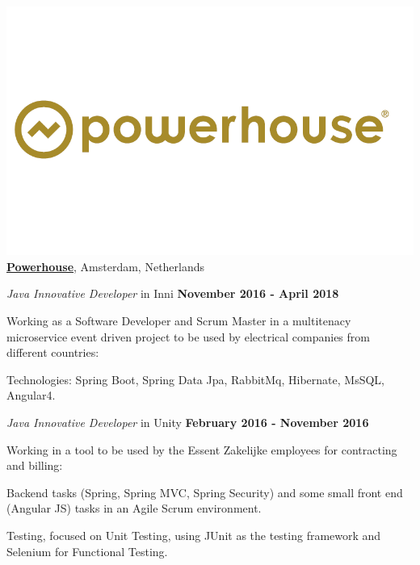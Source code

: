 \includegraphics[scale=0.1]{companies/powerhouse} \href{https://www.powerhouse.nl/}{\textbf{Powerhouse}},
Amsterdam, Netherlands
\begin{outerlist}
\item[] \textit{Java Innovative Developer} in Inni%
        \hfill \textbf{November 2016 - April 2018}

Working as a Software Developer and Scrum Master in a multitenacy microservice event driven project to be used by electrical companies from different countries:
\begin{innerlist}
\item Technologies: Spring Boot, Spring Data Jpa, RabbitMq, Hibernate, MsSQL, Angular4.
\end{innerlist}
\item[] \textit{Java Innovative Developer} in Unity%
        \hfill \textbf{February 2016 - November 2016}

Working in a tool to be used by the Essent Zakelijke employees for contracting and billing:
\begin{innerlist}
\item Backend tasks (Spring, Spring MVC, Spring Security) and some small front end (Angular JS) tasks in an Agile Scrum environment.
\item Testing, focused on Unit Testing, using JUnit as the testing framework and Selenium for Functional Testing.
\end{innerlist}
\end{outerlist}

